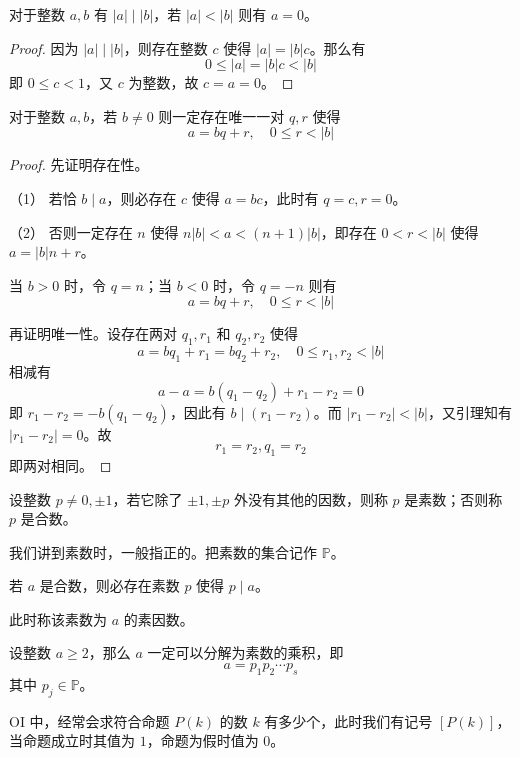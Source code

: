 \begin{lemma}
	对于整数 $a,b$ 有 $|a| \mid |b|$，若 $|a|<|b|$ 则有 $a=0$。
\end{lemma}

\begin{proof}
	因为 $|a| \mid |b|$，则存在整数 $c$ 使得 $|a|=|b|c$。那么有
	\[ 0 \leqslant |a|=|b|c<|b| \]
	即 $0\leqslant c<1$，又 $c$ 为整数，故 $c=a=0$。
\end{proof}

\begin{theorem}
	对于整数 $a,b$，若 $b\ne 0$ 则一定存在唯一一对 $q,r$ 使得
	\[ a=bq+r,\quad 0 \leqslant r< |b| \]
\end{theorem}

\begin{proof}
	先证明存在性。

	（1） 若恰 $b \mid a$，则必存在 $c$ 使得 $a=bc$，此时有 $q=c,r=0$。

	（2） 否则一定存在 $n$ 使得 $n|b|<a<(n+1)|b|$，即存在 $0<r<|b|$ 使得 $a=|b|n+r$。

	当 $b>0$ 时，令 $q=n$；当 $b<0$ 时，令 $q=-n$ 则有
	\[ a=bq+r,\quad 0 \leqslant r< |b| \]

	再证明唯一性。设存在两对 $q_1,r_1$ 和 $q_2,r_2$ 使得
	\[ a=bq_1+r_1=bq_2+r_2,\quad 0 \leqslant r_1,r_2< |b| \]
	相减有
	\[ a-a=b(q_1-q_2)+r_1-r_2=0 \]
	即 $r_1-r_2=-b(q_1-q_2)$，因此有 $b \mid (r_1-r_2)$。而 $|r_1-r_2|<|b|$，又引理知有 $|r_1-r_2|=0$。故
	\[ r_1=r_2,q_1=r_2 \]
	即两对相同。
\end{proof}

\begin{definition}[素数]
	设整数 $p \ne 0,\pm 1$，若它除了 $\pm 1, \pm p$ 外没有其他的因数，则称 $p$ 是素数；否则称 $p$ 是合数。
\end{definition}

我们讲到素数时，一般指正的。把素数的集合记作 $\mathbb{P}$。

\begin{theorem}
	若 $a$ 是合数，则必存在素数 $p$ 使得 $p \mid a$。
\end{theorem}

此时称该素数为 $a$ 的素因数。

\begin{theorem}
	设整数 $a \geqslant 2$，那么 $a$ 一定可以分解为素数的乘积，即
	\[ a = p_1p_2\cdots p_s \]
	其中 $p_j \in \mathbb{P}$。
\end{theorem}

OI 中，经常会求符合命题 $P(k)$ 的数 $k$ 有多少个，此时我们有记号 $[P(k)]$，当命题成立时其值为 $1$，命题为假时值为 $0$。

